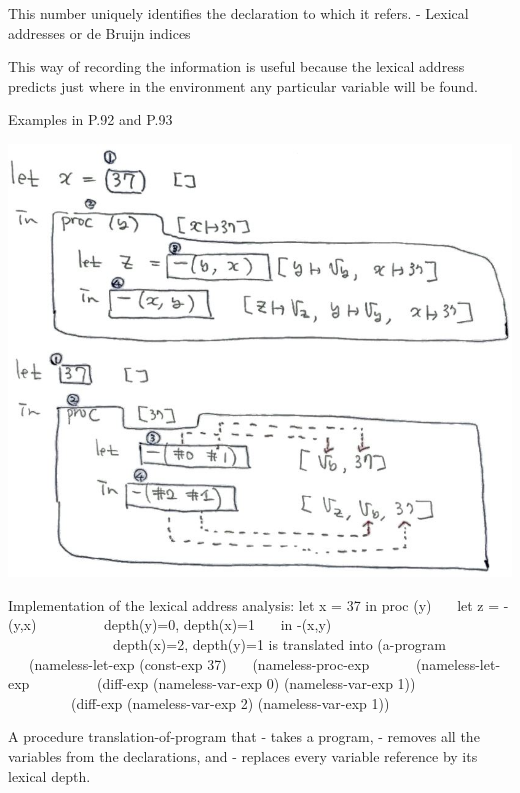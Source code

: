 \documentclass{article}
\begin{document}
\begin{huge}
This number uniquely identifies the declaration to which it refers. \al
- Lexical addresses or de Bruijn indices


This way of recording the information is useful because 
the lexical address predicts just where in the environment 
any particular variable will be found.

Examples in P.92 and P.93


\includegraphics[width=0.75\linewidth]{fig_debruijn_indices}


Implementation of the lexical address analysis: \al
let x = 37 \al
in proc (y) \al
\ \ \ let z = -(y,x) \ \ \ \ \ \ \ \ \ depth(y)=0, depth(x)=1 \al
\ \ \ in -(x,y) \ \ \ \ \ \ \ \ \ \ \ \ \ \ \ depth(x)=2, depth(y)=1 \al
\al
is translated into \al
\al
(a-program \al
\ \ \ (nameless-let-exp (const-exp 37) \al
\ \ \ (nameless-proc-exp \al
\ \ \ \ \ \ (nameless-let-exp \al
\ \ \ \ \ \ \ \ \ (diff-exp (nameless-var-exp 0) (nameless-var-exp 1)) \al
\ \ \ \ \ \ \ \ \ (diff-exp (nameless-var-exp 2) (nameless-var-exp 1)) \al


A procedure translation-of-program that \al
- takes a program, \al
- removes all the variables from the declarations, and \al
- replaces every variable reference by its lexical depth.


\end{huge}
\end{document}
